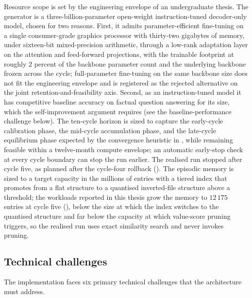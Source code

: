 Resource scope is set by the engineering envelope of an undergraduate thesis. The generator is a three-billion-parameter open-weight instruction-tuned decoder-only model, chosen for two reasons. First, it admits parameter-efficient fine-tuning on a single consumer-grade graphics processor with thirty-two gigabytes of memory, under sixteen-bit mixed-precision arithmetic, through a low-rank adaptation layer on the attention and feed-forward projections, with the trainable footprint at roughly $2$ percent of the backbone parameter count and the underlying backbone frozen across the cycle; full-parameter fine-tuning on the same backbone size does not fit the engineering envelope and is registered as the rejected alternative on the joint retention-and-feasibility axis. Second, as an instruction-tuned model it has competitive baseline accuracy on factual question answering for its size, which the self-improvement argument requires (see the baseline-performance challenge below). The ten-cycle horizon is sized to capture the early-cycle calibration phase, the mid-cycle accumulation phase, and the late-cycle equilibrium phase expected by the convergence heuristic in , while remaining feasible within a twelve-month compute envelope; an automatic early-stop check at every cycle boundary can stop the run earlier. The realised run stopped after cycle five, as planned after the cycle-four rollback (). The episodic memory is sized to a target capacity in the millions of entries with a tiered index that promotes from a flat structure to a quantised inverted-file structure above a threshold; the workloads reported in this thesis grow the memory to $12\,175$ entries at cycle five (), below the size at which the index switches to the quantised structure and far below the capacity at which value-score pruning triggers, so the realised run uses exact similarity search and never invokes pruning.

\subsection{Technical challenges}
\label{sec:scope-challenges}

The implementation faces six primary technical challenges that the architecture must address.

